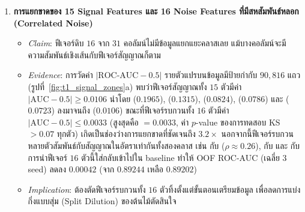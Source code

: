 \begin{enumerate}
  \item \textbf{การแยกขาดของ 15 Signal Features และ 16 Noise Features ที่มีสหสัมพันธ์หลอก (Correlated Noise)}
  \begin{itemize}
    \item \emph{Claim}: ฟีเจอร์ดิบ $16$ จาก $31$ คอลัมน์ไม่มีข้อมูลแยกแยะคลาสเลย แม้บางคอลัมน์จะมีความสัมพันธ์เชิงเส้นกับฟีเจอร์สัญญาณก็ตาม
    \item \emph{Evidence}: การวัดค่า $|\text{ROC-AUC} - 0.5|$ รายตัวแปรบนข้อมูลมีป้ายกำกับ $90,816$ แถว (รูปที่~\ref{fig:t1_signal_zones}a) พบว่าฟีเจอร์สัญญาณทั้ง $15$ ตัวมีค่า $|\text{AUC} - 0.5| \ge 0.0106$ นำโดย  ($0.1965$),  ($0.1315$),  ($0.0824$),  ($0.0786$) และ  ($0.0723$) ลงมาจนถึง  ($0.0106$) ขณะที่ฟีเจอร์รบกวนทั้ง $16$ ตัวมีค่า $|\text{AUC} - 0.5| \le 0.0033$ (สูงสุดคือ  $= 0.0033$, ค่า $p$-value ของการทดสอบ KS $> 0.07$ ทุกตัว) เกิดเป็นช่องว่างการแยกขาดที่ชัดเจนถึง $3.2\times$ นอกจากนี้ฟีเจอร์รบกวนหลายตัวสัมพันธ์กับสัญญาณในอัตราเท่ากันทั้งสองคลาส เช่น  กับ  ($\rho \approx 0.26$),  กับ  และ  กับ  การนำฟีเจอร์ $16$ ตัวนี้ใส่กลับเข้าไปใน baseline ทำให้ OOF ROC-AUC (เฉลี่ย 3 seed) ลดลง $0.00042$ (จาก $0.89244$ เหลือ $0.89202$)
    \item \emph{Implication}: ต้องตัดฟีเจอร์รบกวนทั้ง $16$ ตัวทิ้งตั้งแต่ขั้นตอนเตรียมข้อมูล เพื่อลดการแบ่งกิ่งแบบสุ่ม (Split Dilution) ของต้นไม้ตัดสินใจ
  \end{itemize}


\end{enumerate}
